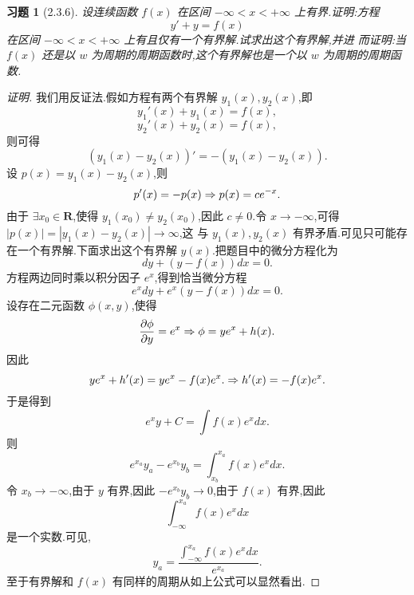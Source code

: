 \documentclass[a4paper, 12pt]{article} %
\newtheorem*{cdtheorem}{习题}
\newenvironment{exercise}
{\bigskip\begin{mdframed}[backgroundcolor=gray!40,rightline=false,leftline=false,topline=false,bottomline=false]\begin{cdtheorem}}
    {\end{cdtheorem}\end{mdframed}\bigskip}
\begin{document}
\begin{exercise}[2.3.6]
设连续函数 $f(x)$ 在区间 $-\infty<x<+\infty$ 上有界.证明:方程
$$
y'+y=f(x)
$$
在区间 $-\infty<x<+\infty$ 上有且仅有一个有界解.试求出这个有界解,并进
而证明:当 $f(x)$ 还是以 $w$ 为周期的周期函数时,这个有界解也是一个以
$w$ 为周期的周期函数.
\end{exercise}
\begin{proof}[证明]
我们用反证法.假如方程有两个有界解 $y_1(x),y_2(x)$,即
\begin{equation}
  \label{eq:1}
  y_1'(x)+y_1(x)=f(x),
\end{equation}
\begin{equation}
  \label{eq:2}
  y_2'(x)+y_2(x)=f(x),
\end{equation}
则可得
\begin{equation}
  \label{eq:3}
  (y_1(x)-y_2(x))'=-(y_1(x)-y_2(x)).
\end{equation}
设 $p(x)=y_1(x)-y_2(x)$,则
\begin{equation}
  \label{eq:4}
  p'(x)=-p(x)\Rightarrow p(x)=ce^{-x}.
\end{equation}
由于 $\exists x_0\in \mathbf{R}$,使得 $y_1(x_0)\neq y_2(x_0)$,因此
$c\neq 0$.令 $x\to -\infty$,可得 $|p(x)|=|y_1(x)-y_2(x)|\to \infty$,这
与 $y_1(x),y_2(x)$ 有界矛盾.可见只可能存在一个有界解.下面求出这个有界解 $y(x)$.把题目中的微分方程化为
\begin{equation}
  \label{eq:11}
  dy+(y-f(x))dx=0.
\end{equation}
方程两边同时乘以积分因子 $e^x$,得到恰当微分方程
\begin{equation}
  \label{eq:12}
  e^xdy+e^x(y-f(x))dx=0.
\end{equation}
设存在二元函数 $\phi(x,y)$,使得
$$
\frac{\partial\phi}{\partial y}=e^x\Rightarrow \phi=ye^x+h(x).
$$
因此
$$
ye^x+h'(x)=ye^x-f(x)e^x.\Rightarrow h'(x)=-f(x)e^x.
$$
于是得到
$$
e^xy+C=\int f(x)e^xdx.
$$
则
$$
e^{x_a}y_a-e^{x_b}y_b=\int_{x_b}^{x_a}f(x)e^xdx.
$$
令 $x_b\to -\infty$,由于 $y$ 有界,因此 $-e^{x_b}y_{b}\to 0$,由于
$f(x)$ 有界,因此
$$
\int_{-\infty}^{x_a}f(x)e^xdx
$$
是一个实数.可见,
$$
y_a=\frac{\int_{-\infty}^{x_{a}}f(x)e^{x}dx}{e^{x_a}}.
$$
至于有界解和 $f(x)$ 有同样的周期从如上公式可以显然看出.
\end{proof}





\end{document}
